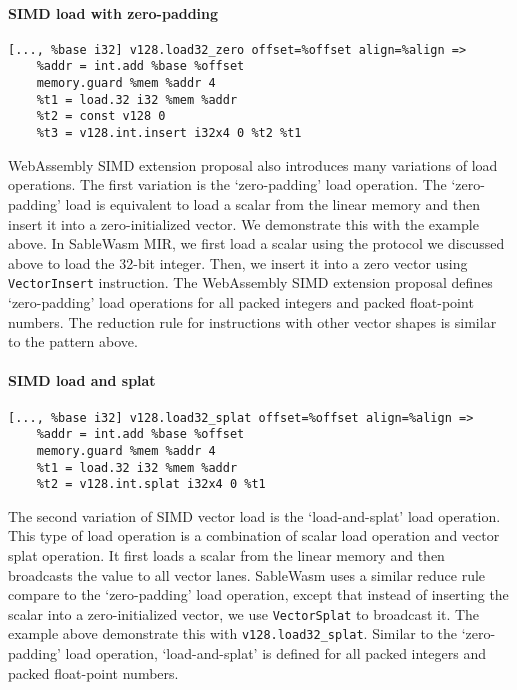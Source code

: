 \paragraph{SIMD load with zero-padding} \quad
\begin{lstlisting}[basicstyle=\linespread{1}\small, language=SableWasmMIR]
[..., %base i32] v128.load32_zero offset=%offset align=%align =>
    %addr = int.add %base %offset
    memory.guard %mem %addr 4
    %t1 = load.32 i32 %mem %addr
    %t2 = const v128 0
    %t3 = v128.int.insert i32x4 0 %t2 %t1
\end{lstlisting}
WebAssembly SIMD extension proposal also introduces many variations of load operations. The first variation is the `zero-padding' load operation. The `zero-padding' load is equivalent to load a scalar from the linear memory and then insert it into a zero-initialized vector. We demonstrate this with the example above. In SableWasm MIR, we first load a scalar using the protocol we discussed above to load the 32-bit integer. Then, we insert it into a zero vector using \texttt{VectorInsert} instruction. The WebAssembly SIMD extension proposal defines `zero-padding' load operations for all packed integers and packed float-point numbers. The reduction rule for instructions with other vector shapes is similar to the pattern above.

\paragraph{SIMD load and splat} \quad
\begin{lstlisting}[basicstyle=\linespread{1}\small, language=SableWasmMIR]
[..., %base i32] v128.load32_splat offset=%offset align=%align =>
    %addr = int.add %base %offset
    memory.guard %mem %addr 4
    %t1 = load.32 i32 %mem %addr
    %t2 = v128.int.splat i32x4 0 %t1
\end{lstlisting}
The second variation of SIMD vector load is the `load-and-splat' load operation. This type of load operation is a combination of scalar load operation and vector splat operation. It first loads a scalar from the linear memory and then broadcasts the value to all vector lanes. SableWasm uses a similar reduce rule compare to the `zero-padding' load operation, except that instead of inserting the scalar into a zero-initialized vector, we use \texttt{VectorSplat} to broadcast it. The example above demonstrate this with \texttt{v128.load32\_splat}. Similar to the `zero-padding' load operation, `load-and-splat' is defined for all packed integers and packed float-point numbers.

